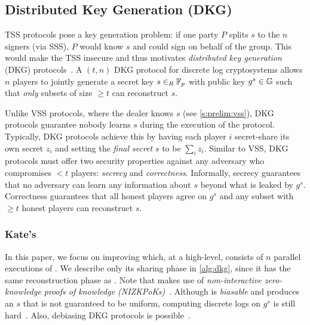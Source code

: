 {\begin{algorithm}[t]
\end{algorithm}
}

\ejfdkgAlgorithm

\subsection{Distributed Key Generation (DKG)}
\label{s:prelim:dkg}

TSS protocols pose a key generation problem: if one party $P$ splits $s$ to the $n$ signers (via SSS), $P$ would know $s$ and could sign on behalf of the group.
This would make the TSS insecure and thus motivates \textit{distributed key generation} (DKG) protocols~\cite{dkg,Pedersen1991AThreshold}.
A $(t,n)$ DKG protocol for discrete log cryptosystems allows $n$ players to jointly generate a secret key $s\in_R \mathbb{F}_p$ with public key $g^s\in \mathbb{G}$ such that \textit{only} subsets of size $\ge t$ can reconstruct $s$.

Unlike VSS protocols, where the dealer knows $s$ (see \cref{s:prelim:vss}), DKG protocols guarantee nobody learns $s$ during the execution of the protocol.
Typically, DKG protocols achieve this by having each player $i$ secret-share its own secret $z_i$ and setting the \textit{final secret} $s$ to be $\sum_i z_i$.
Similar to VSS, DKG protocols must offer two security properties against any adversary who compromises $<t$ players: \textit{secrecy} and \textit{correctness}.
Informally, secrecy guarantees that no adversary can learn any information about $s$ beyond what is leaked by $g^s$.
Correctness guarantees that all honest players agree on $g^s$ and any subset with $\ge t$ honest players can reconstruct $s$.

\multipointEvalFigure

\subsubsection{Kate's \ejfdkg}
In this paper, we focus on improving \ejfdkg which, at a high-level, consists of $n$ parallel executions of \evss.
We describe only its sharing phase in \cref{alg:dkg}, since it has the same reconstruction phase as \evss.
Note that \ejfdkg makes use of \textit{non-interactive zero-knowledge proofs of knowledge (NIZKPoKs)}~\cite{CS97}.
Although \ejfdkg is \textit{biasable} and produces an $s$ that is not guaranteed to be uniform, computing discrete logs on $g^s$ is still hard~\cite{Kate2010Distributed,Gennaro2003SecureApplications}.
Also, debiasing DKG protocols is possible~\cite{dkg,NBB16,SJSW19}.

